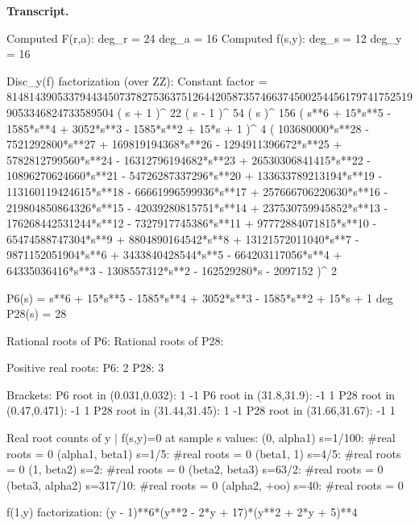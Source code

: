 \documentclass[12pt]{article}
\theoremstyle{remark}
\theoremstyle{definition}
\begin{document}
\noindent\textbf{Transcript.}
\begin{term}
Computed F(r,a): deg_r = 24 deg_a = 16
Computed f(s,y): deg_s = 12 deg_y = 16

Disc_y(f) factorization (over ZZ):
Constant factor = 8148143905337944345073782753637512644205873574663745002544561797417525199053346824733589504
  ( s + 1 )^ 22
  ( s - 1 )^ 54
  ( s )^ 156
  ( s**6 + 15*s**5 - 1585*s**4 + 3052*s**3 - 1585*s**2 + 15*s + 1 )^ 4
  ( 103680000*s**28 - 7521292800*s**27 + 169819194368*s**26 - 1294911396672*s**25 + 5782812799560*s**24 - 16312796194682*s**23 + 26530306841415*s**22 - 10896270624660*s**21 - 54726287337296*s**20 + 133633789213194*s**19 - 113160119424615*s**18 - 66661996599936*s**17 + 257666706220630*s**16 - 219804850864326*s**15 - 42039280815751*s**14 + 237530759945852*s**13 - 176268442531244*s**12 - 7327917745386*s**11 + 97772884071815*s**10 - 65474588747304*s**9 + 8804890164542*s**8 + 13121572011040*s**7 - 9871152051904*s**6 + 3433840428544*s**5 - 664203117056*s**4 + 64335036416*s**3 - 1308557312*s**2 - 162529280*s - 2097152 )^ 2

P6(s) = s**6 + 15*s**5 - 1585*s**4 + 3052*s**3 - 1585*s**2 + 15*s + 1
deg P28(s) = 28

Rational roots of P6: {}
Rational roots of P28: {}

Positive real roots:
P6: 2
P28: 3

Brackets:
P6 root in (0.031,0.032): 1 -1
P6 root in (31.8,31.9): -1 1
P28 root in (0.47,0.471): -1 1
P28 root in (31.44,31.45): 1 -1
P28 root in (31.66,31.67): -1 1

Real root counts of y | f(s,y)=0 at sample s values:
      (0, alpha1)  s=1/100:  #real roots = 0
  (alpha1, beta1)  s=1/5:  #real roots = 0
       (beta1, 1)  s=4/5:  #real roots = 0
       (1, beta2)  s=2:  #real roots = 0
   (beta2, beta3)  s=63/2:  #real roots = 0
  (beta3, alpha2)  s=317/10:  #real roots = 0
    (alpha2, +oo)  s=40:  #real roots = 0

f(1,y) factorization: (y - 1)**6*(y**2 - 2*y + 17)*(y**2 + 2*y + 5)**4
\end{term}

\end{document}
